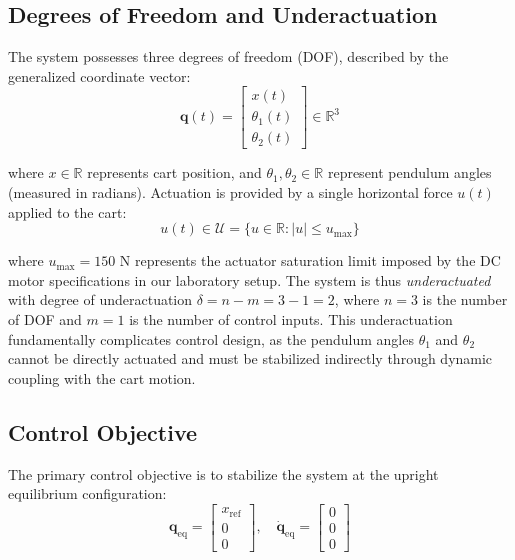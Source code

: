 \subsection{Degrees of Freedom and Underactuation}

The system possesses three degrees of freedom (DOF), described by the generalized coordinate vector:
\begin{equation}
\mathbf{q}(t) = \begin{bmatrix} x(t) \\ \theta_1(t) \\ \theta_2(t) \end{bmatrix} \in \mathbb{R}^3
\label{eq:generalized_coordinates}
\end{equation}

where $x \in \mathbb{R}$ represents cart position, and $\theta_1, \theta_2 \in \mathbb{R}$ represent pendulum angles (measured in radians). Actuation is provided by a single horizontal force $u(t)$ applied to the cart:
\begin{equation}
u(t) \in \mathcal{U} = \{ u \in \mathbb{R} : |u| \leq u_{\max} \}
\label{eq:control_input}
\end{equation}

where $u_{\max} = 150$ N represents the actuator saturation limit imposed by the DC motor specifications in our laboratory setup. The system is thus \textit{underactuated}~\cite{tedrake2009underactuated} with degree of underactuation $\delta = n - m = 3 - 1 = 2$, where $n = 3$ is the number of DOF and $m = 1$ is the number of control inputs. This underactuation fundamentally complicates control design, as the pendulum angles $\theta_1$ and $\theta_2$ cannot be directly actuated and must be stabilized indirectly through dynamic coupling with the cart motion.

\subsection{Control Objective}

The primary control objective is to stabilize the system at the upright equilibrium configuration:
\begin{equation}
\mathbf{q}_{\text{eq}} = \begin{bmatrix} x_{\text{ref}} \\ 0 \\ 0 \end{bmatrix}, \quad \dot{\mathbf{q}}_{\text{eq}} = \begin{bmatrix} 0 \\ 0 \\ 0 \end{bmatrix}
\label{eq:control_objective}
\end{equation}

